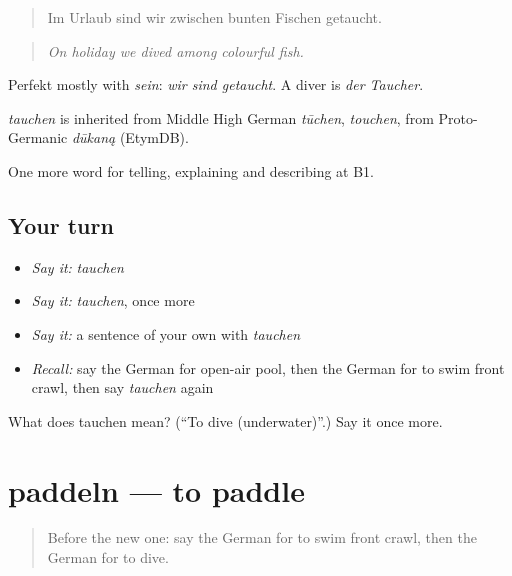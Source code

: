 \begin{quote}
Im Urlaub sind wir zwischen bunten Fischen getaucht.
\end{quote}

\begin{quote}
\emph{On holiday we dived among colourful fish.}
\end{quote}

Perfekt mostly with \emph{sein}: \emph{wir sind getaucht}. A diver is \emph{der Taucher}.

\begin{cousinweb}
\emph{tauchen} is inherited from Middle High German \emph{tūchen}, \emph{touchen}, from Proto-Germanic \emph{dūkaną} (EtymDB).
\end{cousinweb}

\begin{grammarlens}[title={What you've built}]
One more word for telling, explaining and describing at B1.
\end{grammarlens}

\subsection*{Your turn}
\begin{itemize}
\raggedright
  \item \emph{Say it:} \emph{tauchen}
  \item \emph{Say it:} \emph{tauchen}, once more
  \item \emph{Say it:} a sentence of your own with \emph{tauchen}
  \item \emph{Recall:} say the German for open-air pool, then the German for to swim front crawl, then say \emph{tauchen} again
\end{itemize}

\begin{tcolorbox}[breakable,colback=teal!4,colframe=teal!35!black,title={Before you move on}]
What does tauchen mean? (\textquotedblleft{}To dive (underwater)\textquotedblright{}.) Say it once more.
\end{tcolorbox}
\section[paddeln]{paddeln — to paddle}

\label{lesson:GE-C511-paddeln}



\begin{quote}
Before the new one: say the German for to swim front crawl, then the German for to dive.
\end{quote}


